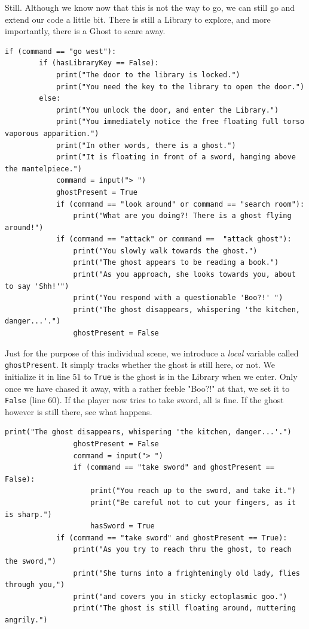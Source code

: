 Still. Although we know now that this is not the way to go, we can still go and extend our code a little bit. There is still a Library to explore, and more importantly, there is a Ghost to scare away. 

\begin{lstlisting}[firstnumber=41]
    if (command == "go west"):
        if (hasLibraryKey == False):
            print("The door to the library is locked.")
            print("You need the key to the library to open the door.")
        else:
            print("You unlock the door, and enter the Library.")
            print("You immediately notice the free floating full torso vaporous apparition.")
            print("In other words, there is a ghost.")
            print("It is floating in front of a sword, hanging above the mantelpiece.")
            command = input("> ")
            ghostPresent = True
            if (command == "look around" or command == "search room"):
                print("What are you doing?! There is a ghost flying around!")
            if (command == "attack" or command ==  "attack ghost"):
                print("You slowly walk towards the ghost.")
                print("The ghost appears to be reading a book.")
                print("As you approach, she looks towards you, about to say 'Shh!'")
                print("You respond with a questionable 'Boo?!' ")
                print("The ghost disappears, whispering 'the kitchen, danger...'.")
                ghostPresent = False
\end{lstlisting}

Just for the purpose of this individual scene, we introduce a \emph{local} variable called \texttt{ghostPresent}. It simply tracks whether the ghost is still here, or not. We initialize it in line 51 to \texttt{True} is the ghost is in the Library when we enter. Only once we have chased it away, with a rather feeble "Boo?!" at that, we set it to \texttt{False} (line 60). If the player now tries to take sword, all is fine. If the ghost however is still there, see what happens. 

\begin{lstlisting}[firstnumber=59]
                print("The ghost disappears, whispering 'the kitchen, danger...'.")
                ghostPresent = False
                command = input("> ")
                if (command == "take sword" and ghostPresent == False):
                    print("You reach up to the sword, and take it.")
                    print("Be careful not to cut your fingers, as it is sharp.")
                    hasSword = True
            if (command == "take sword" and ghostPresent == True):
                print("As you try to reach thru the ghost, to reach the sword,")
                print("She turns into a frighteningly old lady, flies through you,")
                print("and covers you in sticky ectoplasmic goo.")
                print("The ghost is still floating around, muttering angrily.")
\end{lstlisting} 

